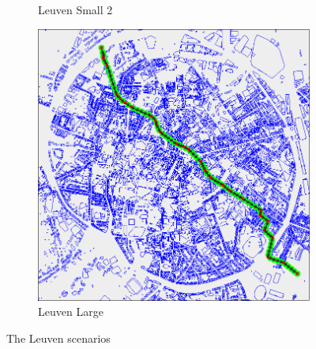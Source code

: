 \begin{figure}
\begin{subfigure}[t]{0.46\textwidth}
        		\caption{Leuven Small 2}
        		\label{fig:leuven-small-2}
	\end{subfigure}	
	\par
	\begin{subfigure}[t]{0.8\textwidth}
        		\includegraphics[width=\textwidth]{img/leuven-large}
        		\caption{Leuven Large}
        		\label{fig:leuven-large}
	\end{subfigure}
        
    \caption{The Leuven scenarios}\label{fig:sf-scens}
\end{figure}


